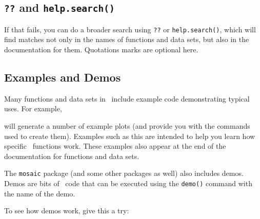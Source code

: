 \subsection{\texttt{??} and \texttt{help.search()}}
If that fails, you can do a broader search using \verb!??! or \verb!help.search()!, 
which will find matches not only in the names of functions and data sets, 
but also in the documentation for them.  Quotations marks are optional here.



\subsection{Examples and Demos}

Many functions and data sets in \R\ include example code demonstrating typical uses.
For example,
\begin{knitrout}
\end{knitrout}

will generate a number of example plots (and provide you with the commands used to create them).
Examples such as this are intended to help you learn how specific \R\ functions work.
These examples also appear at the end of the documentation for functions and data sets.

The \verb!mosaic! package (and some other packages as well) also includes demos.  
Demos are bits of \R\ code that can be executed using the \verb!demo()! command
with the name of the demo.

To see how demos work, give this a try:
\begin{knitrout}
\end{knitrout}


